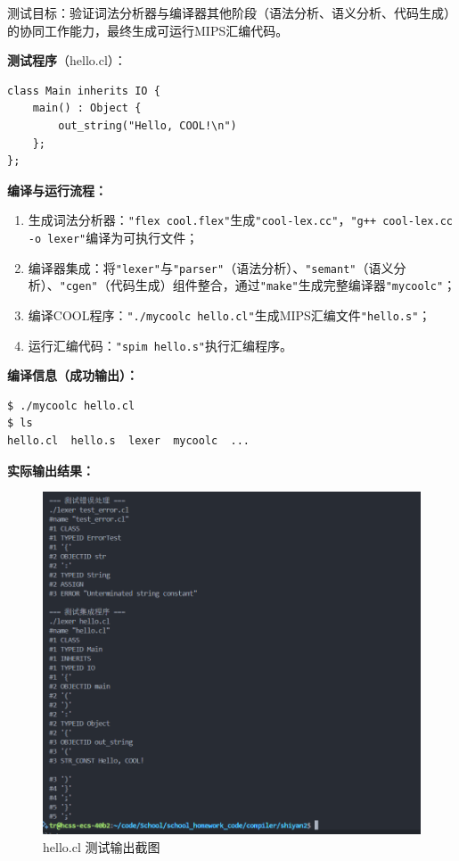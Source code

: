 \documentclass[twocolumn]{article}
\begin{document}
测试目标：验证词法分析器与编译器其他阶段（语法分析、语义分析、代码生成）的协同工作能力，最终生成可运行MIPS汇编代码。

\textbf{测试程序}（hello.cl）：
\begin{lstlisting}[language=cool, caption={集成测试程序}]
class Main inherits IO {
    main() : Object {
        out_string("Hello, COOL!\n")
    };
};
\end{lstlisting}

\textbf{编译与运行流程：}
\begin{enumerate}
    \item 生成词法分析器：\verb|"flex cool.flex"|生成\verb|"cool-lex.cc"|，\verb|"g++ cool-lex.cc -o lexer"|编译为可执行文件；
    
    \item 编译器集成：将\verb|"lexer"|与\verb|"parser"|（语法分析）、\verb|"semant"|（语义分析）、\verb|"cgen"|（代码生成）组件整合，通过\verb|"make"|生成完整编译器\verb|"mycoolc"|；
    
    \item 编译COOL程序：\verb|"./mycoolc hello.cl"|生成MIPS汇编文件\verb|"hello.s"|；
    
    \item 运行汇编代码：\verb|"spim hello.s"|执行汇编程序。
\end{enumerate}
\textbf{编译信息（成功输出）：}
\begin{verbatim}
$ ./mycoolc hello.cl
$ ls
hello.cl  hello.s  lexer  mycoolc  ...
\end{verbatim}

\textbf{实际输出结果：}
\begin{figure}[H]
    \centering
    \includegraphics[width=\linewidth]{hello.png}  %
    \caption{hello.cl 测试输出截图}  %
\end{figure}
\end{document}
